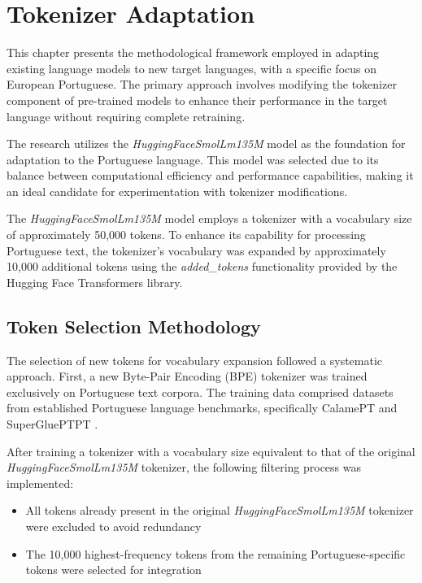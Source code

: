 
\chapter{Tokenizer Adaptation}


\label{chap:tokenizer_adaptation}

This chapter presents the methodological framework employed in adapting existing language models to new target languages, with a specific focus on European Portuguese. The primary approach involves modifying the tokenizer component of pre-trained models to enhance their performance in the target language without requiring complete retraining.

The research utilizes the \textit{HuggingFaceSmolLm135M} model as the foundation for adaptation to the Portuguese language. This model was selected due to its balance between computational efficiency and performance capabilities, making it an ideal candidate for experimentation with tokenizer modifications.

The \textit{HuggingFaceSmolLm135M} model employs a tokenizer with a vocabulary size of approximately 50,000 tokens. To enhance its capability for processing Portuguese text, the tokenizer's vocabulary was expanded by approximately 10,000 additional tokens using the \textit{added\_tokens} functionality provided by the Hugging Face Transformers library.

\section{Token Selection Methodology}
The selection of new tokens for vocabulary expansion followed a systematic approach. First, a new Byte-Pair Encoding (BPE) tokenizer was trained exclusively on Portuguese text corpora. The training data comprised datasets from established Portuguese language benchmarks, specifically CalamePT \cite{calamept} and SuperGluePTPT \cite{superglue_pt}.

After training a tokenizer with a vocabulary size equivalent to that of the original \textit{HuggingFaceSmolLm135M} tokenizer, the following filtering process was implemented:

\begin{itemize}
    \item All tokens already present in the original \textit{HuggingFaceSmolLm135M} tokenizer were excluded to avoid redundancy
    \item The 10,000 highest-frequency tokens from the remaining Portuguese-specific tokens were selected for integration
\end{itemize}

